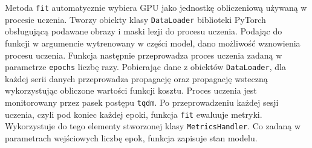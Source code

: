 \par Metoda \texttt{fit} automatycznie wybiera GPU jako jednostkę obliczeniową używaną w procesie uczenia. Tworzy obiekty klasy  \texttt{DataLoader} biblioteki PyTorch obsługującą podawane obrazy i maski lezji do procesu uczenia. Podając do funkcji w argumencie wytrenowany w części model, dano możliwość wznowienia procesu uczenia. Funkcja następnie przeprowadza proces uczenia zadaną w parametrze \texttt{epochs} liczbę razy. Pobierając dane  z obiektów \texttt{DataLoader}, dla każdej serii danych przeprowadza propagację oraz propagację wsteczną wykorzystując obliczone wartości funkcji kosztu. Proces uczenia jest monitorowany przez pasek postępu \texttt{tqdm}. Po przeprowadzeniu każdej sesji uczenia, czyli pod koniec każdej epoki, funkcja \texttt{fit} ewaluuje metryki. Wykorzystuje do tego elementy stworzonej klasy \texttt{MetricsHandler}. Co zadaną w parametrach  wejściowych liczbę epok, funkcja zapisuje stan modelu.




